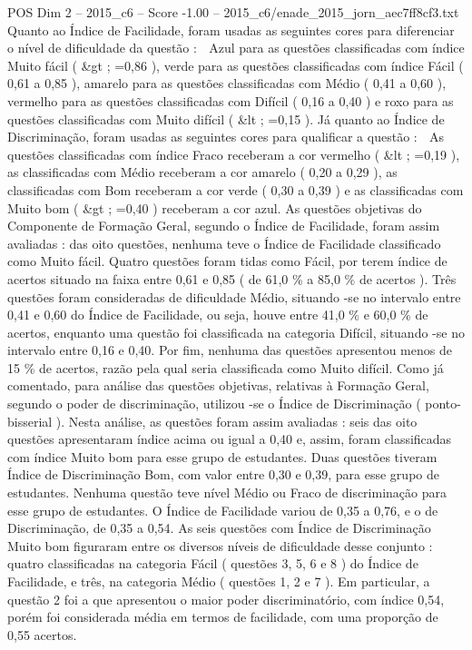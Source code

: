 \begin{textsample}{POS Dim 2 – 2015\_c6 – Score -1.00 – 2015\_c6/enade\_2015\_jorn\_aec7ff8cf3.txt}
Quanto ao Índice de Facilidade, foram usadas as seguintes cores para diferenciar o nível de dificuldade da questão :  Azul para as questões classificadas com índice Muito fácil ( \&gt ; =0,86 ), verde para as questões classificadas com índice Fácil ( 0,61 a 0,85 ), amarelo para as questões classificadas com Médio ( 0,41 a 0,60 ), vermelho para as questões classificadas com Difícil ( 0,16 a 0,40 ) e roxo para as questões classificadas com Muito difícil ( \&lt ; =0,15 ).
Já quanto ao Índice de Discriminação, foram usadas as seguintes cores para qualificar a questão :  As questões classificadas com índice Fraco receberam a cor vermelho ( \&lt ; =0,19 ), as classificadas com Médio receberam a cor amarelo ( 0,20 a 0,29 ), as classificadas com Bom receberam a cor verde ( 0,30 a 0,39 ) e as classificadas com Muito bom ( \&gt ; =0,40 ) receberam a cor azul.
As questões objetivas do Componente de Formação Geral, segundo o Índice de Facilidade, foram assim avaliadas : das oito questões, nenhuma teve o Índice de Facilidade classificado como Muito fácil.
Quatro questões foram tidas como Fácil, por terem índice de acertos situado na faixa entre 0,61 e 0,85 ( de 61,0 \% a 85,0 \% de acertos ).
Três questões foram consideradas de dificuldade Médio, situando -se no intervalo entre 0,41 e 0,60 do Índice de Facilidade, ou seja, houve entre 41,0 \% e 60,0 \% de acertos, enquanto uma questão foi classificada na categoria Difícil, situando -se no intervalo entre 0,16 e 0,40.
Por fim, nenhuma das questões apresentou menos de 15 \% de acertos, razão pela qual seria classificada como Muito difícil.
Como já comentado, para análise das questões objetivas, relativas à Formação Geral, segundo o poder de discriminação, utilizou -se o Índice de Discriminação ( ponto- bisserial ).
Nesta análise, as questões foram assim avaliadas : seis das oito questões apresentaram índice acima ou igual a 0,40 e, assim, foram classificadas com índice Muito bom para esse grupo de estudantes.
Duas questões tiveram Índice de Discriminação Bom, com valor entre 0,30 e 0,39, para esse grupo de estudantes.
Nenhuma questão teve nível Médio ou Fraco de discriminação para esse grupo de estudantes.
O Índice de Facilidade variou de 0,35 a 0,76, e o de Discriminação, de 0,35 a 0,54.
As seis questões com Índice de Discriminação Muito bom figuraram entre os diversos níveis de dificuldade desse conjunto : quatro classificadas na categoria Fácil ( questões 3, 5, 6 e 8 ) do Índice de Facilidade, e três, na categoria Médio ( questões 1, 2 e 7 ).
Em particular, a questão 2 foi a que apresentou o maior poder discriminatório, com índice 0,54, porém foi considerada média em termos de facilidade, com uma proporção de 0,55 acertos.

\end{textsample}

